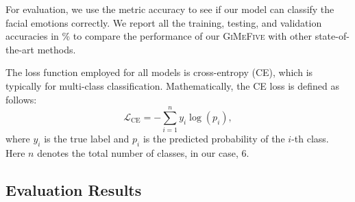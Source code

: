 For evaluation, we use the metric accuracy to see if our model can classify the facial emotions correctly. 
We report all the training, testing, and validation accuracies in 
\% to compare the performance of our \textsc{GiMeFive} with other state-of-the-art methods. 

The loss function employed for all models is cross-entropy (CE), 
which is typically for multi-class classification. 
Mathematically, the CE loss is defined as follows: 
\begin{equation}
  \mathcal{L}_{\text{CE}} = -\sum_{i=1}^{n} y_i \log(p_i),
\end{equation}
where $y_i$ is the true label and $p_i$ is the predicted probability of the $i$-th class. 
Here $n$ denotes the total number of classes, in our case, 6.

\subsection{Evaluation Results}
\label{sec:evaluation:results}

